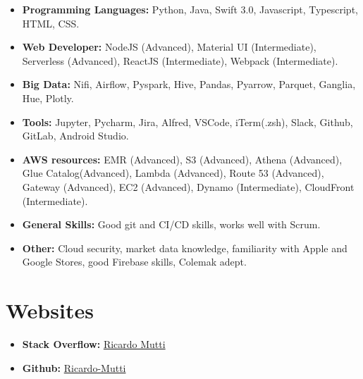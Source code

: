 \documentclass[11pt,a4paper,sans]{moderncv}
\begin{document}
\begin{itemize}

\item \textbf{Programming Languages:} Python, Java, Swift 3.0, Javascript, Typescript, HTML, CSS.
\vspace{6pt}

\item \textbf{Web Developer:} NodeJS (Advanced), Material UI (Intermediate), Serverless (Advanced), ReactJS (Intermediate), Webpack (Intermediate).
\vspace{6pt}

\item \textbf{Big Data:} Nifi, Airflow, Pyspark, Hive, Pandas, Pyarrow, Parquet, Ganglia, Hue, Plotly.
\vspace{6pt}

\item \textbf{Tools:} Jupyter, Pycharm, Jira, Alfred, VSCode, iTerm(.zsh), Slack, Github, GitLab, Android Studio.
\vspace{6pt}

\item \textbf{AWS resources:} EMR (Advanced), S3 (Advanced), Athena (Advanced), Glue Catalog(Advanced), Lambda (Advanced), Route 53 (Advanced),  Gateway (Advanced), EC2 (Advanced), Dynamo (Intermediate), CloudFront (Intermediate).

\vspace{6pt}

\item \textbf{General Skills:} Good git and CI/CD skills, works well with Scrum.

\vspace{6pt}

\item \textbf{Other:} Cloud security, market data knowledge, familiarity with Apple and Google Stores, good Firebase skills, Colemak adept.

\end{itemize}

\section{Websites}

\begin{itemize}

\item \textbf{Stack Overflow:} \href{https://stackoverflow.com/users/5848237/ricardo-mutti?tab=profile}{Ricardo Mutti}
\item \textbf{Github:} \href{https://github.com/Ricardo-Mutti}{Ricardo-Mutti}

\end{itemize}
\vspace{6pt}
\end{document}
